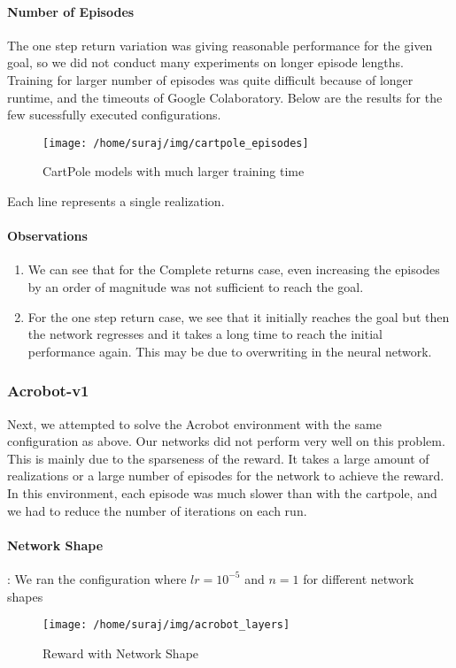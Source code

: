 \documentclass[A4]{article}
\begin{document}
    \paragraph{Number of Episodes}
    The one step return variation was giving reasonable performance for the given goal, so we did not conduct many experiments on longer episode lengths.
    Training for larger number of episodes was quite difficult because of longer runtime, and the timeouts of Google Colaboratory.
    Below are the results for the few sucessfully executed configurations.

    \begin{figure}[H]
        \centering
        \texttt{[image: /home/suraj/img/cartpole\_episodes]}
        \caption{CartPole models with much larger training time}
        \label{fig:}
    \end{figure}
    Each line represents a single realization.

    \paragraph{Observations}
    \begin{enumerate}
        \item We can see that for the Complete returns case, even increasing the episodes by an order of magnitude was not sufficient to reach the goal.
        \item For the one step return case, we see that it initially reaches the goal but then the network regresses and it takes a long time to reach the initial performance again.
        This may be due to overwriting in the neural network.
    \end{enumerate}

    \subsubsection{Acrobot-v1}
    Next, we attempted to solve the Acrobot environment with the same configuration as above. Our networks did not perform very well on this problem. This is mainly due to the sparseness of the reward. It takes a large amount of realizations or a large number of episodes for the network to achieve the reward.
    In this environment, each episode was much slower than with the cartpole, and we had to reduce the number of iterations on each run.

    \paragraph{Network Shape}:
    We ran the configuration where $lr=10^{-5}$ and $n=1$ for different network shapes
    \begin{figure}[H]
        \centering
        \texttt{[image: /home/suraj/img/acrobot\_layers]}
        \caption{Reward with Network Shape}
        \label{fig:}
    \end{figure}
\end{document}
